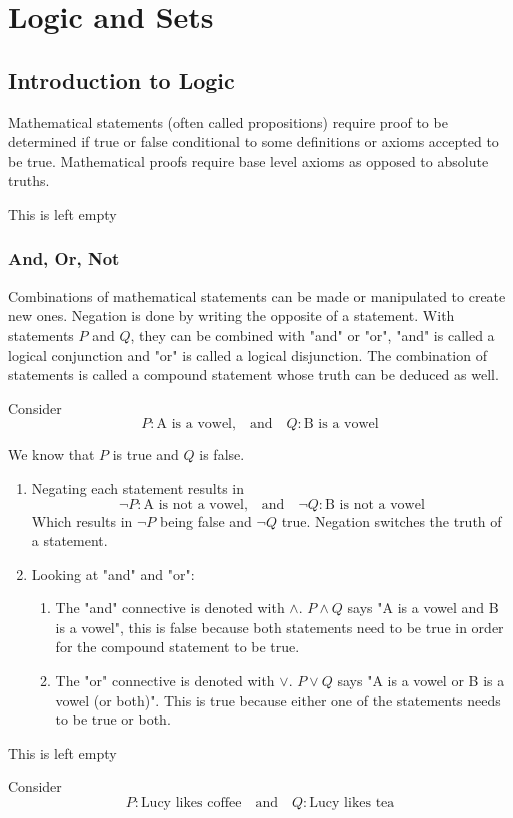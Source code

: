 \chapter{Logic and Sets}

\section{Introduction to Logic}

Mathematical statements (often called propositions) require proof to be determined if true or false conditional to some definitions or axioms accepted to be true.
Mathematical proofs require base level axioms as opposed to absolute truths.

\begin{remark}
    This is left empty
\end{remark}

\subsection{And, Or, Not}

Combinations of mathematical statements can be made or manipulated to create new ones.
Negation is done by writing the opposite of a statement.
With statements $P$ and $Q$, they can be combined with "and" or "or", "and" is called a logical conjunction and "or" is called a logical disjunction.
The combination of statements is called a compound statement whose truth can be deduced as well.

\begin{example}
    Consider
    $$
    P: \text{A is a vowel,} \quad \text{and} \quad Q: \text{B is a vowel}
    $$

    We know that $P$ is true and $Q$ is false.

    \begin{enumerate}
        \item Negating each statement results in
            $$
            \neg P: \text{A is not a vowel,} \quad \text{and} \quad \neg Q: \text{B is not a vowel}
            $$
            Which results in $\neg P$ being false and $\neg Q$ true. Negation switches the truth of a statement.
        \item Looking at "and" and "or":
            \begin{enumerate}[label=(\alph*)]
                \item The "and" connective is denoted with $\land$. $P \land Q$ says "A is a vowel and B is a vowel", this is false because both statements need to be true in order for the compound statement to be true.
                \item The "or" connective is denoted with $\lor$. $P \lor Q$ says "A is a vowel or B is a vowel (or both)". This is true because either one of the statements needs to be true or both.
            \end{enumerate}
    \end{enumerate}
\end{example}

\begin{remark}
    This is left empty
\end{remark}

\begin{example}
    Consider 
    $$
    P: \text{Lucy likes coffee} \quad \text{and} \quad Q: \text{Lucy likes tea}
    $$

\end{example}
